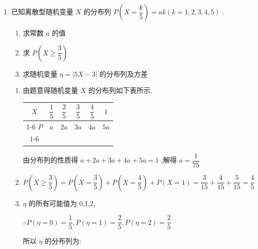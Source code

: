 \begin{enumerate}
\begin{enumerate}
        \item 已知离散型随机变量 $X$ 的分布列 $P\left( {X = \dfrac{k}{5}}\right)  = {ak}\left( {k = 1,2,3,4,5}\right)$ .
        \begin{enumerate}
            \item 求常数 $a$ 的值
            \item 求 $P\left( {X \geq  \dfrac{3}{5}}\right)$
            \item 求随机变量 $\eta  = \left| {{5X} - 3}\right|$ 的分布列及方差
        \end{enumerate}
        \begin{jieda}
            \begin{enumerate}
                \item 由题意得随机变量 $X$ 的分布列如下表所示.
                
                \begin{center}
                
                \begin{tabular}{|c|c|c|c|c|c|}
                \hline
                $X$ & $\dfrac{1}{5}$ & $\dfrac{2}{5}$ & $\dfrac{3}{5}$ & $\dfrac{4}{5}$ & $1$ \\
                \cline{1-6}
                $P$ & $a$ & $2a$ & $3a$ & $4a$ & $5a$ \\
                \cline{1-6}
                \hline
                \end{tabular}
                
                \end{center}
                
                由分布列的性质得 $a + {2a} + {3a} + {4a} + {5a} = 1$ ,解得 $a = \dfrac{1}{75}$
                
                \item $P\left( {X \geq  \dfrac{3}{5}}\right)  = P\left( {X = \dfrac{3}{5}}\right)  + P\left( {X = \dfrac{4}{5}}\right)  + P\left( {X = 1}\right)  = \dfrac{3}{15} + \dfrac{4}{15} + \dfrac{5}{15} = \dfrac{4}{5}$
                
                \item $\eta$ 的所有可能值为 0,1,2,
                
                $\therefore P\left( {\eta  = 0}\right)  = \dfrac{1}{5},P\left( {\eta  = 1}\right)  = \dfrac{2}{5},P\left( {\eta  = 2}\right)  = \dfrac{2}{5}$
                
                所以 $\eta$ 的分布列为:
                

\end{enumerate}
\end{jieda}
\end{enumerate}
\end{enumerate}
